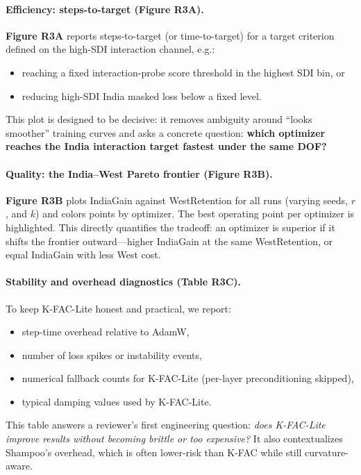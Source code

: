 \paragraph{Efficiency: steps-to-target (Figure R3A).}
\textbf{Figure R3A} reports steps-to-target (or time-to-target) for a target criterion defined on the high-SDI interaction channel, e.g.:
\begin{itemize}[leftmargin=*,itemsep=2pt]
\item reaching a fixed interaction-probe score threshold in the highest SDI bin, or
\item reducing high-SDI India masked loss below a fixed level.
\end{itemize}
This plot is designed to be decisive: it removes ambiguity around ``looks smoother'' training curves and asks a concrete question: \textbf{which optimizer reaches the India interaction target fastest under the same DOF?}

\vspace{4pt}
\paragraph{Quality: the India--West Pareto frontier (Figure R3B).}
\textbf{Figure R3B} plots IndiaGain against WestRetention for all runs (varying seeds, $r$, and $k$) and colors points by optimizer. The best operating point per optimizer is highlighted. This directly quantifies the tradeoff: an optimizer is superior if it shifts the frontier outward---higher IndiaGain at the same WestRetention, or equal IndiaGain with less West cost.

\vspace{4pt}
\paragraph{Stability and overhead diagnostics (Table R3C).}
To keep K-FAC-Lite honest and practical, we report:
\begin{itemize}[leftmargin=*,itemsep=2pt]
\item step-time overhead relative to AdamW,
\item number of loss spikes or instability events,
\item numerical fallback counts for K-FAC-Lite (per-layer preconditioning skipped),
\item typical damping values used by K-FAC-Lite.
\end{itemize}
This table answers a reviewer’s first engineering question: \emph{does K-FAC-Lite improve results without becoming brittle or too expensive?} It also contextualizes Shampoo’s overhead, which is often lower-risk than K-FAC while still curvature-aware.


